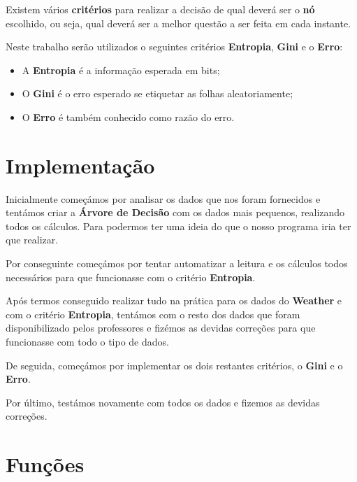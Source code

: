 \documentclass[11pt]{article}   %
\begin{document}
Existem vários \textbf{critérios} para realizar a decisão de qual deverá ser o \textbf{nó} escolhido, ou seja,
qual deverá ser a melhor questão a ser feita em cada instante. \par
Neste trabalho serão utilizados o seguintes critérios \textbf{Entropia}, \textbf{Gini} e o \textbf{Erro}:
\begin{itemize}
    \item A \textbf{Entropia} é a informação esperada em bits;
    \item O \textbf{Gini} é o erro esperado se etiquetar as folhas aleatoriamente; 
    \item O \textbf{Erro} é também conhecido como razão do erro.
\end{itemize}

\section{Implementação}
\hspace{0,5cm}Inicialmente começámos por analisar os dados que nos foram fornecidos e tentámos criar
a \textbf{Árvore de Decisão} com os dados mais pequenos, realizando todos os cálculos. Para podermos 
ter uma ideia do que o nosso programa iria ter que realizar.

Por conseguinte começámos por tentar automatizar a leitura e os cálculos todos necessários para que funcionasse
com o critério \textbf{Entropia}.

Após termos conseguido realizar tudo na prática para os dados do \textbf{Weather} e com o critério
\textbf{Entropia}, tentámos com o resto dos dados que foram disponibilizado pelos professores e 
fizémos as devidas correções para que funcionasse com todo o tipo de dados.

De seguida, começámos por implementar os dois restantes critérios, o \textbf{Gini} e o \textbf{Erro}.

Por último, testámos novamente com todos os dados e fizemos as devidas correções.
\section{Funções}
\end{document}
